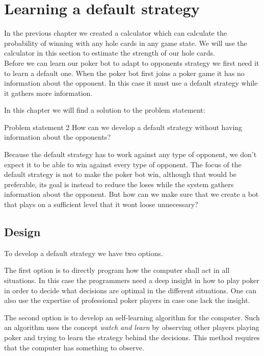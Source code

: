 \section{Learning a default strategy}
\label{sec:part2}
In the previous chapter we created a calculator which can calculate the probability of winning with any hole cards in any game state. We will use the calculator in this section to estimate the strength of our hole cards.\\

Before we can learn our poker bot to adapt to opponents strategy we first need it to learn a default one. When the poker bot first joins a poker game it has no information about the opponent. In this case it must use a default strategy while it gathers more information.

In this chapter we will find a solution to the problem statement:

\vspace{4mm}
\begin{statementBox2}{Problem statement 2}
How can we develop a default strategy without having information about the opponents?
\end{statementBox2}
\vspace{4mm}

Because the default strategy has to work against any type of opponent, we don't expect it to be able to win against every type of opponent. The focus of the default strategy is not to make the poker bot win, although that would be preferable, its goal is instead to reduce the loses while the system gathers information about the opponent. But how can we make sure that we create a bot that plays on a sufficient level that it wont loose unnecessary?

\subsection{Design}
To develop a default strategy we have two options.

The first option is to directly program how the computer shall act in all situations. In this case the programmers need a deep insight in how to play poker in order to decide what decisions are optimal in the different situations. One can also use the expertise of professional poker players in case one lack the insight.

The second option is to develop an self-learning algorithm for the computer. Such an algorithm uses the concept \textit{watch and learn} by observing other players playing poker and trying to learn the strategy behind the decisions. This method requires that the computer has something to observe.

